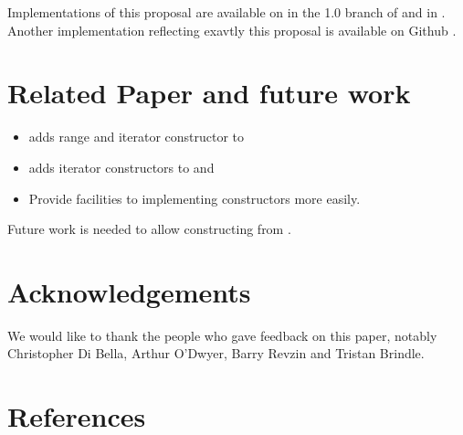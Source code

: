 \documentclass{wg21}
\begin{document}
Implementations of this proposal are available on in the 1.0 branch of \cite{Range V3} and in \cite{cmcstl2}.
Another implementation reflecting exavtly this proposal is available on Github \cite{rangesnext}.


\section{Related Paper and future work}

\begin{itemize}
	\item {} adds range and iterator constructor to 
    \item \cite{P1425} adds iterator constructors to  and 
    \item \cite{P1419} Provide facilities to implementing  constructors more easily.
\end{itemize}

Future work is needed to allow constructing  from .

\section{Acknowledgements}
We would like to thank the people who gave feedback on this paper, notably Christopher Di Bella, Arthur O'Dwyer, Barry Revzin
and Tristan Brindle.\\

\section{References}
\renewcommand{\section}[2]{}%

\end{document}
